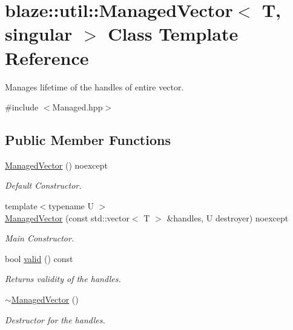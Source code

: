 \hypertarget{classblaze_1_1util_1_1ManagedVector}{}\section{blaze\+:\+:util\+:\+:Managed\+Vector$<$ T, singular $>$ Class Template Reference}
\label{classblaze_1_1util_1_1ManagedVector}


Manages lifetime of the handles of entire vector.  




{\ttfamily \#include $<$Managed.\+hpp$>$}

\subsection*{Public Member Functions}
\begin{DoxyCompactItemize}
\item 
\mbox{\label{classblaze_1_1util_1_1ManagedVector_a786dfc0cf1d0d0b85576ed888be64590}} 
\hyperlink{classblaze_1_1util_1_1ManagedVector_a786dfc0cf1d0d0b85576ed888be64590}{Managed\+Vector} () noexcept
\begin{DoxyCompactList}\small\item\em Default Constructor. \end{DoxyCompactList}\item 
{\footnotesize template$<$typename U $>$ }\\\hyperlink{classblaze_1_1util_1_1ManagedVector_af065b9675c2de2a2bb162321dc4eb71e}{Managed\+Vector} (const std\+::vector$<$ T $>$ \&handles, U destroyer) noexcept
\begin{DoxyCompactList}\small\item\em Main Constructor. \end{DoxyCompactList}\item 
bool \hyperlink{classblaze_1_1util_1_1ManagedVector_a583d0bfad0ed4c1e0dc32c800124a187}{valid} () const
\begin{DoxyCompactList}\small\item\em Returns validity of the handles. \end{DoxyCompactList}\item 
\mbox{\label{classblaze_1_1util_1_1ManagedVector_ae399dc2470dfc7c978b8b11aa32aea2a}} 
\hyperlink{classblaze_1_1util_1_1ManagedVector_ae399dc2470dfc7c978b8b11aa32aea2a}{$\sim$\+Managed\+Vector} ()
\begin{DoxyCompactList}\small\item\em Destructor for the handles. \end{DoxyCompactList}\end{DoxyCompactItemize}
